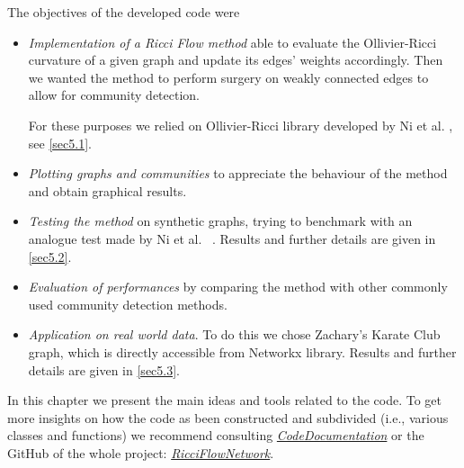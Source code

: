The objectives of the developed code were
\begin{itemize}
    \item \emph{Implementation of a Ricci Flow method} able to evaluate the Ollivier-Ricci curvature of a given graph and update its edges' weights accordingly. Then we wanted the method to perform surgery on weakly connected edges to allow for community detection.
    
    For these purposes we relied on Ollivier-Ricci library developed by Ni et al. \cite{Ollivier-RicciLib}, see \autoref{sec5.1}.
    
    \item \emph{Plotting graphs and communities} to appreciate the behaviour of the method and obtain graphical results.
    
    \item \emph{Testing the method} on synthetic graphs, trying to benchmark with an analogue test made by Ni et al. ~\cite{Ni:communitydetectionnetworksricci}. Results and further details are given in \autoref{sec5.2}.
    
    \item \emph{Evaluation of performances} by comparing the method with other commonly used community detection methods.  
    
    \item \emph{Application on real world data}. To do this we chose Zachary's Karate Club graph, which is directly accessible from Networkx library. Results and further details are given in \autoref{sec5.3}.
    
\end{itemize}

In this chapter we present the main ideas and tools related to the code. To get more insights on how the code as been constructed and subdivided (i.e., various classes and functions) we recommend consulting \textit{\href{https://fabbri-lorenzo.github.io/RicciFlowNetwork/}{CodeDocumentation}} or the GitHub of the whole project: \textit{\href{https://github.com/fabbri-lorenzo/RicciFlowNetwork}{RicciFlowNetwork}}.